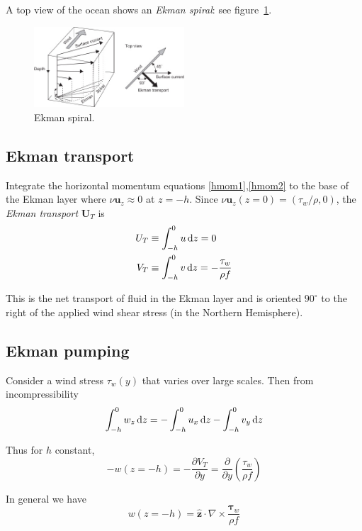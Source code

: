 \documentclass{jknotes}
\begin{document}
A top view of the ocean shows an \emph{Ekman spiral}: see
figure~\ref{fig:ekman}.
\begin{figure}
	\centering
	\includegraphics[width=0.5\textwidth]{ekman_spiral.jpg}
	\caption{Ekman spiral.}
	\label{fig:ekman}
\end{figure}

\subsection{Ekman transport}
Integrate the horizontal momentum equations \eqref{hmom1},\eqref{hmom2} to the
base of the Ekman layer where $\nu \bm{u}_z \approx 0$ at $z=-h$. Since $\nu
\bm{u}_z (z=0) = (\tau_w/\rho, 0)$, the \emph{Ekman transport} $\bm{U}_T$ is
\begin{equation}
	\begin{aligned}
		U_T &\equiv \int_{-h}^0 u \, \diffd z = 0 \\
		V_T &\equiv \int_{-h}^0 v \, \diffd z = -\frac{\tau_w}{\rho f}
	\end{aligned}
\end{equation}

This is the net transport of fluid in the Ekman layer and is oriented
$90^{\circ}$ to the right of the applied wind shear stress (in the Northern
Hemisphere).

\subsection{Ekman pumping}
Consider a wind stress $\tau_w(y)$ that varies over large scales. Then from
incompressibility
\begin{equation}
	\int_{-h}^0 w_z \, \diffd z = -\int_{-h}^0 u_x \, \diffd z - \int_{-h}^0
	v_y \, \diffd z
\end{equation}

Thus for $h$ constant, 
\begin{equation}-w(z=-h) = -\frac{\partial V_T}{\partial y} =
\frac{\partial}{\partial y}\left( \frac{\tau_w}{\rho f}\right)
\end{equation}

In general we have
\begin{equation}
	w(z=-h) = \hat{\bm{z}} \cdot \nabla \times \frac{\bm{\tau}_w}{\rho f}
\end{equation}
\end{document}
